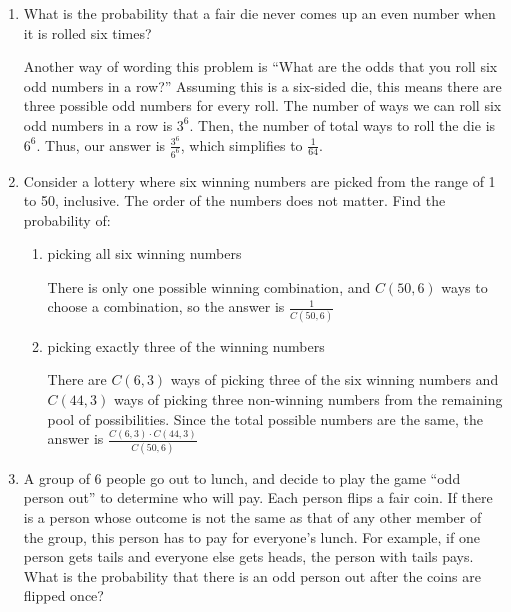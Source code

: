 \documentclass[12pt]{article}
\newenvironment{answer}{\larger[2]}{}
\begin{document}
\begin{enumerate}
\begin{enumerate}[itemsep=\fill,after=\vfill\vfill]
\end{enumerate} %



\item What is the probability that a fair die never comes up an even number when
it is rolled six times?

\begin{answer}
Another way of wording this problem is ``What are the odds that you roll six odd
numbers in a row?'' Assuming this is a six-sided die, this means there are three
possible odd numbers for every roll. The number of ways we can roll six odd
numbers in a row is $3^6$. Then, the number of total ways to roll the die is
$6^6$. Thus, our answer is $\frac{3^6}{6^6}$, which simplifies to
$\frac{1}{64}$.
\end{answer}

\vfill

\newpage



\item Consider a lottery where six winning numbers are picked from the range of
1 to 50, inclusive. The order of the numbers does not matter. Find the
probability of:
%
\begin{enumerate}[itemsep=\fill,after=\vfill] %

\item picking all six winning numbers

\begin{answer}
There is only one possible winning combination, and $C(50, 6)$ ways to choose a
combination, so the answer is $\frac{1}{C(50, 6)}$
\end{answer}

\item picking exactly three of the winning numbers

\begin{answer}
There are $C(6,3)$ ways of picking three of the six winning numbers and
$C(44,3)$ ways of picking three non-winning numbers from the remaining pool of
possibilities. Since the total possible numbers are the same, the answer is
$\frac{C(6,3) \cdot C(44,3)}{C(50, 6)}$
\end{answer}

\end{enumerate} %



\item A group of 6 people go out to lunch, and decide to play the game ``odd
person out'' to determine who will pay. Each person flips a fair coin. If there
is a person whose outcome is not the same as that of any other member of the
group, this person has to pay for everyone's lunch. For example, if one person
gets tails and everyone else gets heads, the person with tails pays. What is the
probability that there is an odd person out after the coins are flipped once?


\end{enumerate}
\end{document}
